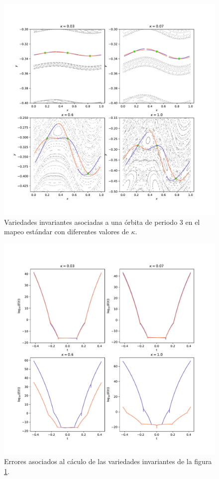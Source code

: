 \begin{figure}
	\centering
	\includegraphics[scale=0.7]{variedadesestandarperiodo3}
	\caption{Variedades invariantes asociadas a una \'orbita de periodo 3 en el mapeo est\'andar con diferentes valores de $\kappa$.}
	\label{variedadesestandarperiodo3}
\end{figure}
\begin{figure}
	\centering
	\includegraphics[scale=0.7]{erroresvariedadesestandarperiodo3}
	\caption{Errores asociados al c\'aculo de las variedades invariantes de la figura \ref{variedadesestandarperiodo3}. }
	\label{erroresvariedadesperiodo3}
\end{figure}
